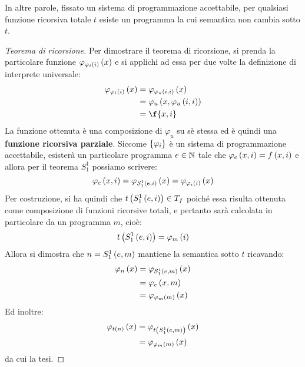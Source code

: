 \documentclass{lectures}
\begin{document}
\begin{multicols}{2}
\begin{theorem}
        In altre parole, fissato un sistema di programmazione accettabile, per qualsiasi funzione ricorsiva totale \(t\) esiste un programma la cui semantica non cambia sotto \(t\).
    \end{theorem}
    \begin{proof}[Teorema di ricorsione]
        Per dimostrare il teorema di ricorsione, si prenda la particolare funzione \(\varphi_{\varphi_i\left(i\right)}\left(x\right)\) e si applichi ad essa per due volte la definizione di interprete universale:
        \begin{align*}
            \varphi_{\varphi_i\rnd{i}}\rnd{x} &= \varphi_{\varphi_u\rnd{i,i}}\rnd{x}\\
            &= \varphi_u\rnd{x, \varphi_u\rnd{i,i}}\\
            &= \f{x,i}
        \end{align*}
        La funzione ottenuta è una composizione di \(\varphi_u\) su sè stessa ed è quindi una \textbf{funzione ricorsiva parziale}. Siccome \(\left\{\varphi_i\right\}\) è un sistema di programmazione accettabile, esisterà un particolare programma \(e \in \mathbb{N}\) tale che \(\varphi_e\left(x,i\right) = f\left(x,i\right)\) e allora per il teorema \(S^1_1\) possiamo scrivere:
        \[
            \varphi_e\left(x,i\right) = \varphi_{S_1^1\left(e,i\right)}\left(x\right) = \varphi_{\varphi_i\left(i\right)}\left(x\right)
        \]
        Per costruzione, si ha quindi che \(t\left(S_1^1\left(e,i\right)\right) \in T_f\) poiché essa risulta ottenuta come composizione di funzioni ricorsive totali, e pertanto sarà calcolata in particolare da un programma \(m\), cioè:
        \[
            t\left(S_1^1\left(e,i\right)\right) = \varphi_m\left(i\right)
        \]
        Allora si dimostra che \(n=S_1^1\left(e,m\right)\) mantiene la semantica sotto \(t\) ricavando:
        \begin{align*}
            \varphi_n\left(x\right) &= \varphi_{S^1_1\left(e,m\right)}\left(x\right)\\
            &= \varphi_e\left(x,m\right)\\
            &= \varphi_{\varphi_m\left(m\right)}\left(x\right)
        \end{align*}
        Ed inoltre:
        \begin{align*}
            \varphi_{t\left(n\right)}\left(x\right) &= \varphi_{t\left(S_1^1\left(e,m\right)\right)}\left(x\right)\\
            &= \varphi_{\varphi_m\left(m\right)}\left(x\right)
        \end{align*}
        da cui la tesi.
    \end{proof}
\end{multicols}
\end{document}
